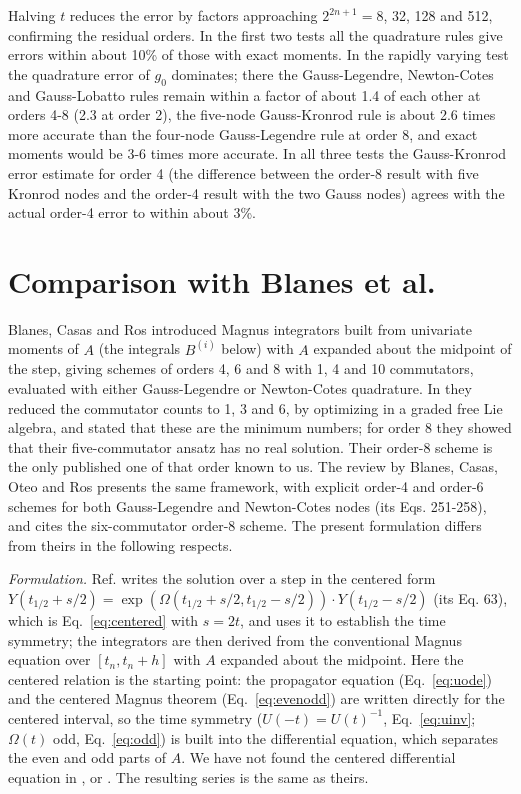 \documentclass[12pt]{article}
\begin{document}
\noindent Halving $t$ reduces the error by factors approaching $2^{2n+1}=8$, 32, 128 and 512, confirming the residual orders. In the first two tests all the quadrature rules give errors within about 10\% of those with exact moments. In the rapidly varying test the quadrature error of $g_0$ dominates; there the Gauss-Legendre, Newton-Cotes and Gauss-Lobatto rules remain within a factor of about 1.4 of each other at orders 4-8 (2.3 at order 2), the five-node Gauss-Kronrod rule is about 2.6 times more accurate than the four-node Gauss-Legendre rule at order 8, and exact moments would be 3-6 times more accurate. In all three tests the Gauss-Kronrod error estimate for order 4 (the difference between the order-8 result with five Kronrod nodes and the order-4 result with the two Gauss nodes) agrees with the actual order-4 error to within about 3\%.

\section*{Comparison with Blanes et al.}

Blanes, Casas and Ros \cite{bcr2000} introduced Magnus integrators built from univariate moments of $A$ (the integrals $B^{(i)}$ below) with $A$ expanded about the midpoint of the step, giving schemes of orders 4, 6 and 8 with 1, 4 and 10 commutators, evaluated with either Gauss-Legendre or Newton-Cotes quadrature. In \cite{bcr2002} they reduced the commutator counts to 1, 3 and 6, by optimizing in a graded free Lie algebra, and stated that these are the minimum numbers; for order 8 they showed that their five-commutator ansatz has no real solution. Their order-8 scheme is the only published one of that order known to us. The review by Blanes, Casas, Oteo and Ros \cite{bcor2009} presents the same framework, with explicit order-4 and order-6 schemes for both Gauss-Legendre and Newton-Cotes nodes (its Eqs. 251-258), and cites the six-commutator order-8 scheme. The present formulation differs from theirs in the following respects.

\emph{Formulation.} Ref. \cite{bcor2009} writes the solution over a step in the centered form $Y(t_{1/2}+s/2)=\exp(\Omega(t_{1/2}+s/2,t_{1/2}-s/2))\cdot Y(t_{1/2}-s/2)$ (its Eq. 63), which is Eq.~\ref{eq:centered} with $s=2t$, and uses it to establish the time symmetry; the integrators are then derived from the conventional Magnus equation over $[t_n,t_n+h]$ with $A$ expanded about the midpoint. Here the centered relation is the starting point: the propagator equation (Eq.~\ref{eq:uode}) and the centered Magnus theorem (Eq.~\ref{eq:evenodd}) are written directly for the centered interval, so the time symmetry ($U(-t)=U(t)^{-1}$, Eq.~\ref{eq:uinv}; $\Omega(t)$ odd, Eq.~\ref{eq:odd}) is built into the differential equation, which separates the even and odd parts of $A$. We have not found the centered differential equation in \cite{bcr2000}, \cite{bcr2002} or \cite{bcor2009}. The resulting series is the same as theirs.
\end{document}
